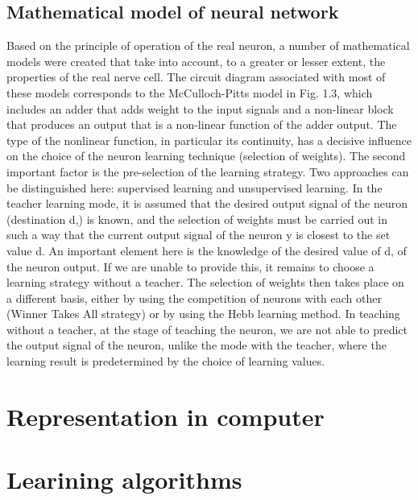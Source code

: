 \FloatBarrier
\subsection{Mathematical model of neural network}
Based on the principle of operation of the real neuron, a number of mathematical models were 
created that take into account, to a greater or lesser extent, the properties of 
the real nerve cell. 
The circuit diagram associated with most of these models corresponds to the McCulloch-Pitts model 
in Fig. 1.3, which includes an adder that adds weight to the input signals and a 
non-linear block that produces an output that is a non-linear function of the adder output. 
The type of the nonlinear function, in particular its continuity, has a decisive influence on 
the choice of the neuron learning technique (selection of weights). 
The second important factor is the pre-selection of the learning strategy. 
Two approaches can be distinguished here: supervised learning and unsupervised learning. 
In the teacher learning mode, it is assumed that the desired output signal of the neuron 
(destination d,) is known, and the selection of weights must be carried out in such a way that the 
current output signal of the neuron y is closest to the set value d. 
An important element here is the knowledge of the desired value of d, of the neuron output. 
If we are unable to provide this, it remains to choose a learning strategy without a teacher. 
The selection of weights then takes place on a different basis, either by using the competition of 
neurons with each other (Winner Takes All strategy) or by using the Hebb learning method. 
In teaching without a teacher, at the stage of teaching the neuron, we are not able to predict the 
output signal of the neuron, unlike the mode with the teacher, where the learning result 
is predetermined by the choice of learning values. 

\FloatBarrier
\section{Representation in computer}

\FloatBarrier
\section{Learining algorithms}

